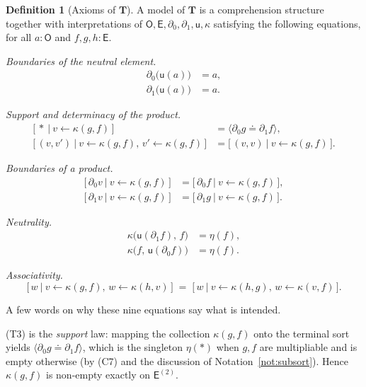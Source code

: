 \documentclass[11pt]{article}
\theoremstyle{definition}
\newtheorem{definition}{Definition}[section]
\theoremstyle{plain}
\newcommand{\Ob}{\mathsf{O}}            %
\newcommand{\Ed}{\mathsf{E}}            %
\newcommand{\unit}{\eta}                %
\newcommand{\guard}[1]{\langle #1\rangle}
\newcommand{\eq}{\mathrel{\doteq}}      %
\newcommand{\gen}[2]{#1\!\leftarrow\!#2}%
\newcommand{\dl}{\partial_{0}}          %
\newcommand{\dr}{\partial_{1}}          %
\newcommand{\uu}{\mathsf{u}}            %
\newcommand{\kk}{\kappa}                %
\newcommand{\pt}{\ast}                  %
\newcommand{\compr}[2]{\bigl[\,#1 \ \big|\ #2\,\bigr]}
\begin{document}
\begin{definition}[Axioms of $\mathbf{T}$]\label{def:axioms}
A model of $\mathbf{T}$ is a comprehension structure together with
interpretations of $\Ob,\Ed,\dl,\dr,\uu,\kk$ satisfying the following equations,
for all $a\colon\Ob$ and $f,g,h\colon\Ed$.

\medskip
\noindent\emph{Boundaries of the neutral element.}
\begin{align}
  \dl\bigl(\uu(a)\bigr) &= a, \tag{T1}\\
  \dr\bigl(\uu(a)\bigr) &= a. \tag{T2}
\end{align}

\noindent\emph{Support and determinacy of the product.}
\begin{align}
  \compr{\pt}{\gen{v}{\kk(g,f)}}
    &= \guard{\dl g\eq\dr f}, \tag{T3}\\
  \compr{(v,v')}{\gen{v}{\kk(g,f)},\,\gen{v'}{\kk(g,f)}}
    &= \compr{(v,v)}{\gen{v}{\kk(g,f)}}. \tag{T4}
\end{align}

\noindent\emph{Boundaries of a product.}
\begin{align}
  \compr{\dl v}{\gen{v}{\kk(g,f)}}
    &= \compr{\dl f}{\gen{v}{\kk(g,f)}}, \tag{T5}\\
  \compr{\dr v}{\gen{v}{\kk(g,f)}}
    &= \compr{\dr g}{\gen{v}{\kk(g,f)}}. \tag{T6}
\end{align}

\noindent\emph{Neutrality.}
\begin{align}
  \kk\bigl(\uu(\dr f),\,f\bigr) &= \unit(f), \tag{T7}\\
  \kk\bigl(f,\,\uu(\dl f)\bigr) &= \unit(f). \tag{T8}
\end{align}

\noindent\emph{Associativity.}
\begin{equation}
  \compr{w}{\gen{v}{\kk(g,f)},\,\gen{w}{\kk(h,v)}}
  \;=\;
  \compr{w}{\gen{v}{\kk(h,g)},\,\gen{w}{\kk(v,f)}}. \tag{T9}
\end{equation}
\end{definition}

A few words on why these nine equations say what is intended.

(T3) is the \emph{support} law: mapping the collection $\kk(g,f)$ onto the
terminal sort yields $\guard{\dl g\eq\dr f}$, which is the singleton
$\unit(\pt)$ when $g,f$ are multipliable and is empty otherwise (by (C7) and the
discussion of Notation~\ref{not:subsort}). Hence $\kk(g,f)$ is non-empty exactly
on $\Ed^{(2)}$.
\end{document}
